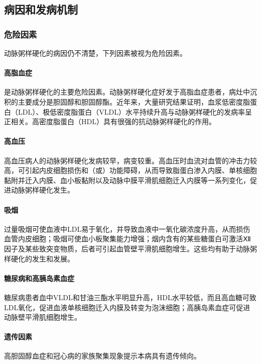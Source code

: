 \subsection{病因和发病机制}

\subsubsection{危险因素}

动脉粥样硬化的病因仍不清楚，下列因素被视为危险因素。

\paragraph{高脂血症}
是动脉粥样硬化的主要危险因素。动脉粥样硬化症好发于高脂血症患者，病灶中沉积的主要成分是胆固醇和胆固醇酯。近年来，大量研究结果证明，血浆低密度脂蛋白（LDL）、极低密度脂蛋白（VLDL）水平持续升高与动脉粥样硬化的发病率呈正相关。高密度脂蛋白（HDL）具有很强的抗动脉粥样硬化的作用。

\paragraph{高血压}
高血压病人的动脉粥样硬化发病较早，病变较重。高血压时血流对血管的冲击力较高，可引起内皮细胞损伤和（或）功能障碍，从而导致脂蛋白渗入内膜、单核细胞黏附并迁入内膜、血小板黏附以及动脉中膜平滑肌细胞迁入内膜等一系列变化，促进动脉粥样硬化发生。

\paragraph{吸烟}
过量吸烟可使血液中LDL易于氧化，并导致血液中一氧化碳浓度升高，从而损伤血管内皮细胞；吸烟可使血小板聚集能力增强；烟内含有的某些糖蛋白可激活Ⅻ因子及某些致突变物质，后者可引起血管壁平滑肌细胞增生。这些均有助于动脉粥样硬化的发生和发展。

\paragraph{糖尿病和高胰岛素血症}
糖尿病患者血中VLDL和甘油三酯水平明显升高，HDL水平较低，而且高血糖可致LDL氧化，促进血液单核细胞迁入内膜及转变为泡沫细胞；高胰岛素血症可促进动脉壁平滑肌细胞增生。

\paragraph{遗传因素}
高胆固醇血症和冠心病的家族聚集现象提示本病具有遗传倾向。

